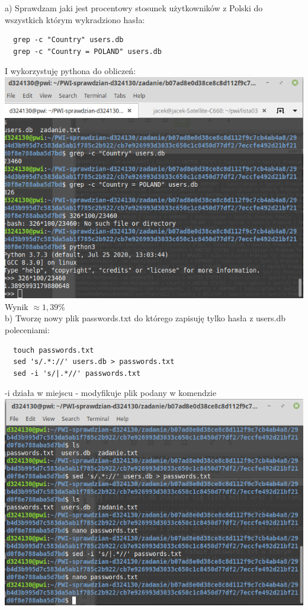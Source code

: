 \documentclass{article}
\begin{document}
\begin{enumerate}
a) Sprawdzam jaki jest procentowy stosunek użytkowników z Polski do wszystkich którym wykradziono hasła:
 \begin{verbatim}
  grep -c "Country" users.db
  grep -c "Country = POLAND" users.db 
 \end{verbatim}
 I wykorzystuję pythona do obliczeń:\\
 \includegraphics[scale=0.4]{zadanie.png}\\
 Wynik $\approx 1,39 \%$
 \\b) Tworzę nowy plik passwords.txt do którego zapisuję tylko hasła z users.db poleceniami:
 \begin{verbatim}
  touch passwords.txt
  sed 's/.*://' users.db > passwords.txt
  sed -i 's/|.*//' passwords.txt
 \end{verbatim}
 -i działa w miejscu - modyfikuje plik podany w komendzie\\
 \includegraphics[scale=0.4]{passwords.png}\vspace{0.3cm}\\

\end{enumerate}
\end{document}
